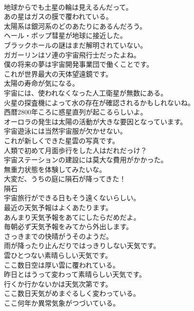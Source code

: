\documentclass[8pt]{extreport}
\begin{document}
\begin{CJK}{UTF8}{min}
\\	地球からでも土星の輪は見えるんだって。	
\\	あの星はガスの膜で覆われている。	
\\	太陽系は銀河系のどのあたりにあるんだろう。	
\\	ヘール・ボップ彗星が地球に接近した。	
\\	ブラックホールの謎はまだ解明されていない。	
\\	ガガーリンはソ連の宇宙飛行士だったよね。	
\\	僕の将来の夢は宇宙開発事業団で働くことです。	
\\	これが世界最大の天体望遠鏡です。	
\\	太陽の寿命が気になる。	
\\	宇宙には、使われなくなった人工衛星が無数にある。	
\\	火星の探査機によって水の存在が確認されるかもしれないね。	
\\	西暦2800年ころに惑星直列が起こるらしいよ。	
\\	オーロラの発生は太陽の活動が大きな要因となっています。	
\\	宇宙遊泳には当然宇宙服が欠かせない。	
\\	これが新しくできた星雲の写真です。	
\\	人類で初めて月面歩行をした人はだれだっけ？	
\\	宇宙ステーションの建設には莫大な費用がかかった。	
\\	無重力状態を体験してみたいな。	
\\	大変だ、うちの庭に隕石が降ってきた！	
\\	隕石
\\	宇宙旅行ができる日もそう遠くないらしい。	
\\	最近の天気予報はよくあたります。	
\\	あんまり天気予報をあてにしたらだめだよ。	
\\	毎朝必ず天気予報をみてから外出します。	
\\	さっきまでの快晴がうそのようだ。	
\\	雨が降ったり止んだりではっきりしない天気です。	
\\	雲ひとつない素晴らしい天気です。	
\\	ここ数日空は厚い雲に覆われている。	
\\	昨日とはうって変わって素晴らしい天気です。	
\\	行くか行かないかは天気次第です。	
\\	ここ数日天気がめまぐるしく変わっている。	
\\	ここ何年か異常気象がつづいている。	

\end{CJK}
\end{document}
